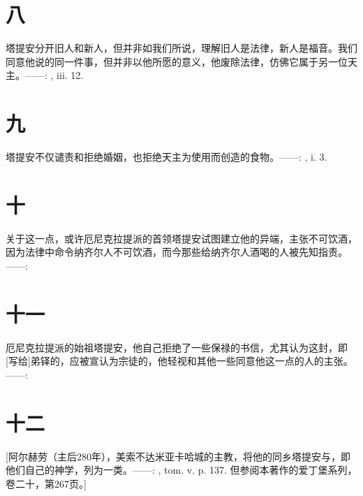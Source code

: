 
\section{八}

塔提安分开旧人和新人，但并非如我们所说，理解旧人是法律，新人是福音。我们同意他说的同一件事，但并非以他所愿的意义，他废除法律，仿佛它属于另一位天主。——: , iii. 12.\par


\section{九}

塔提安不仅谴责和拒绝婚姻，也拒绝天主为使用而创造的食物。——: , i. 3.\par


\section{十}

关于这一点，或许厄尼克拉提派的首领塔提安试图建立他的异端，主张不可饮酒，因为法律中命令纳齐尔人不可饮酒，而今那些给纳齐尔人酒喝的人被先知指责。——: \par


\section{十一}

厄尼克拉提派的始祖塔提安，他自己拒绝了一些保禄的书信，尤其认为这封，即[写给]弟铎的，应被宣认为宗徒的，他轻视和其他一些同意他这一点的人的主张。——: \par


\section{十二}

[阿尔赫劳（主后280年），美索不达米亚卡哈城的主教，将他的同乡塔提安与，即他们自己的神学，列为一类。——: , tom. v. p. 137. 但参阅本著作的爱丁堡系列，卷二十，第267页。]\par

